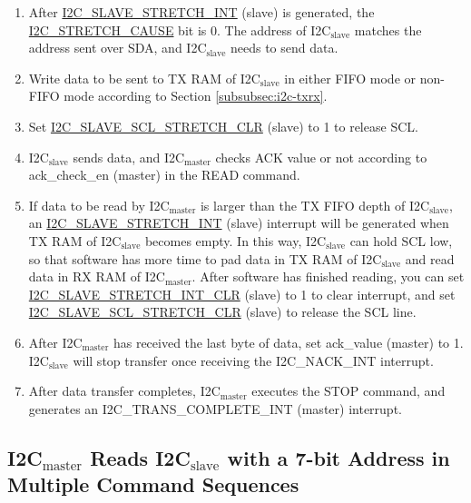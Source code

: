 \documentclass[main\_\_EN.tex]{subfiles}
\begin{document}
\begin{enumerate}
\item After \hyperref[int:i2c-slave-stretch]{I2C\_SLAVE\_STRETCH\_INT} (slave) is generated, the \hyperref[fielddesc:I2CSTRETCHCAUSE]{I2C\_STRETCH\_CAUSE} bit is 0. The address of I2C$_\text{slave}$ matches the address sent over SDA, and I2C$_\text{slave}$ needs to send data.

\item Write data to be sent to TX RAM of I2C$_\text{slave}$ in either FIFO mode or non-FIFO mode according to Section \ref{subsubsec:i2c-txrx}.
\item Set \hyperref[fielddesc:I2CSLAVESCLSTRETCHCLR]{I2C\_SLAVE\_SCL\_STRETCH\_CLR} (slave) to 1 to release SCL.


\item I2C$_\text{slave}$ sends data, and I2C$_\text{master}$ checks ACK value or not according to ack\_check\_en (master) in the READ command.
\item If data to be read by I2C$_\text{master}$ is larger than the TX FIFO depth of I2C$_\text{slave}$, an \hyperref[int:i2c-slave-stretch]{I2C\_SLAVE\_STRETCH\_INT} (slave) interrupt will be generated when TX RAM of I2C$_\text{slave}$ becomes empty. In this way, I2C$_\text{slave}$ can hold SCL low, so that software has more time to pad data in TX RAM of I2C$_\text{slave}$ and read data in RX RAM of I2C$_\text{master}$. After software has finished reading, you can set \hyperref[fielddesc:I2CSLAVESTRETCHINTCLR]{I2C\_SLAVE\_STRETCH\_INT\_CLR} (slave) to 1 to clear interrupt, and set \hyperref[fielddesc:I2CSLAVESCLSTRETCHCLR]{I2C\_SLAVE\_SCL\_STRETCH\_CLR} (slave) to release the SCL line.

\item After I2C$_\text{master}$ has received the last byte of data, set ack\_value (master) to 1. I2C$_\text{slave}$ will stop transfer once receiving the I2C\_NACK\_INT interrupt.

\item After data transfer completes, I2C$_\text{master}$ executes the STOP command, and generates an I2C\_TRANS\_COMPLETE\_INT (master) interrupt.
\end{enumerate}





\subsection{\texorpdfstring{I2C$_\text{master}$ Reads I2C$_\text{slave}$ with a 7-bit Address in Multiple Command Sequences}{I2C master Reads I2C slave with a 7-bit Address in Multiple Command Sequences}}
\end{document}
